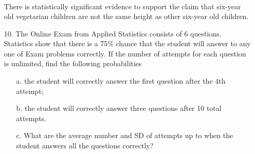 \documentclass[letterpaper,12pt]{article}
\begin{document}
\begin{enumerate}
\begin{align*}
    \end{align*}
    There is statistically significant evidence to support the claim that six-year old vegetarian children are not the same height as other six-year old children.
  \item[10.]
    The Online Exam from Applied Statistics consists of 6 questions. Statistics show that there is a 75\% chance that the student will answer to any one of Exam problems correctly. If the number of attempts for each question is unlimited, find the following probabilities
    \begin{enumerate}
      \item[a.]
        the student will correctly answer the first question after the 4th attempt;
      \item[b.]
        the student will correctly answer three questions after 10 total attempts.
      \item[c.]
        What are the average number and SD of attempts up to when the student answers all the questions correctly?
    \end{enumerate}
\end{enumerate}
\end{document}
